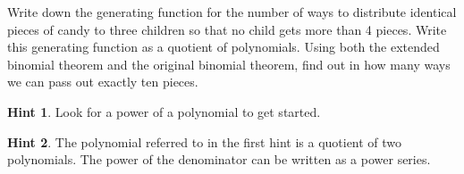 \documentclass{book}
\begin{document}
\setcounter{cpjt}{255}
\addtocounter{cpjt}{-1}
\begin{activity}\label{candygenfn}
\hypertarget{p-1322}{}%
Write down the generating function for the number of ways to distribute identical pieces of candy to three children so that no child gets more than 4 pieces. Write this generating function as a quotient of polynomials. Using both the extended binomial theorem and the original binomial theorem, find out in how many ways we can pass out exactly ten pieces.%
\par\smallskip%
\noindent\textbf{Hint 1}.\hypertarget{hint-163}{}\quad%
\hypertarget{p-1323}{}%
Look for a power of a polynomial to get started.%
\par\smallskip%
\noindent\textbf{Hint 2}.\hypertarget{hint-164}{}\quad%
\hypertarget{p-1324}{}%
The polynomial referred to in the first hint is a quotient of two polynomials.  The power of the denominator can be written as a power series.%
\par\smallskip%
\noindent\end{activity}

\clearpage
\end{document}
